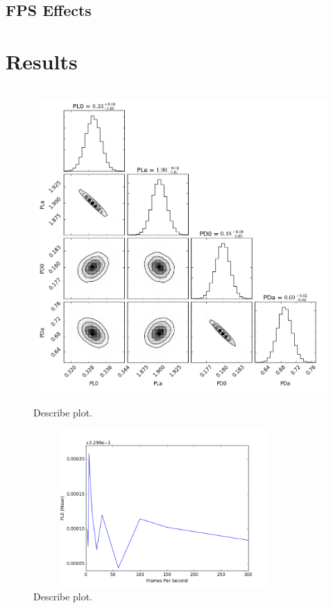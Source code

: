 \documentclass[a4paper,12pt, oneside]{article}
\begin{document}
\subsection{FPS Effects}
\section{Results}
\begin{figure}[H]
        \includegraphics[width=12cm, height=12cm]{Final_PL0,PLa,PD0,PDa_nsteps=20,000_nwalkers=8}
	\centering
	\caption{\color{red} Describe plot.}
\end{figure}

\begin{figure}[H]
        \includegraphics[width=10cm, height=6cm]{meanvsFPS}
	\centering
	\caption{\color{red} Describe plot.}
\end{figure}
\end{document}
